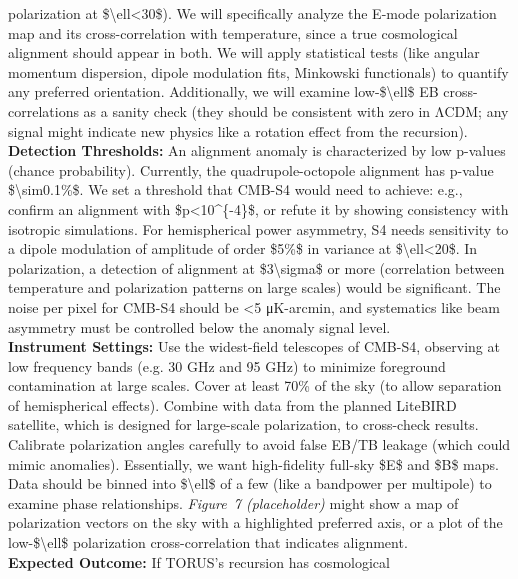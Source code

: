 \documentclass[]{article}
\begin{document}
\begin{enumerate}
  polarization at \$\textbackslash{}ell\textless{}30\$)​. We will
  specifically analyze the E-mode polarization map and its
  cross-correlation with temperature, since a true cosmological
  alignment should appear in both​. We will apply statistical tests
  (like angular momentum dispersion, dipole modulation fits, Minkowski
  functionals) to quantify any preferred orientation. Additionally, we
  will examine low-\$\textbackslash{}ell\$ EB cross-correlations as a
  sanity check (they should be consistent with zero in ΛCDM; any signal
  might indicate new physics like a rotation effect from the
  recursion).\\
  \textbf{Detection Thresholds:} An alignment anomaly is characterized
  by low p-values (chance probability). Currently, the
  quadrupole-octopole alignment has p-value
  \$\textbackslash{}sim0.1\%\$​. We set a threshold that CMB-S4 would
  need to achieve: e.g., confirm an alignment with
  \$p\textless{}10\^{}\{-4\}\$, or refute it by showing consistency with
  isotropic simulations. For hemispherical power asymmetry, S4 needs
  sensitivity to a dipole modulation of amplitude of order \$5\%\$ in
  variance at \$\textbackslash{}ell\textless{}20\$. In polarization, a
  detection of alignment at \$3\textbackslash{}sigma\$ or more
  (correlation between temperature and polarization patterns on large
  scales) would be significant. The noise per pixel for CMB-S4 should be
  \textless{}5 μK-arcmin, and systematics like beam asymmetry must be
  controlled below the anomaly signal level.\\
  \textbf{Instrument Settings:} Use the widest-field telescopes of
  CMB-S4, observing at low frequency bands (e.g. 30 GHz and 95 GHz) to
  minimize foreground contamination at large scales. Cover at least 70\%
  of the sky (to allow separation of hemispherical effects). Combine
  with data from the planned LiteBIRD satellite, which is designed for
  large-scale polarization, to cross-check results​. Calibrate
  polarization angles carefully to avoid false EB/TB leakage (which
  could mimic anomalies). Essentially, we want high-fidelity full-sky
  \$E\$ and \$B\$ maps. Data should be binned into
  \$\textbackslash{}ell\$ of a few (like a bandpower per multipole) to
  examine phase relationships. \emph{Figure~7 (placeholder)} might show
  a map of polarization vectors on the sky with a highlighted preferred
  axis, or a plot of the low-\$\textbackslash{}ell\$ polarization
  cross-correlation that indicates alignment.\\
  \textbf{Expected Outcome:} If TORUS's recursion has cosmological

\end{enumerate}
\end{document}
